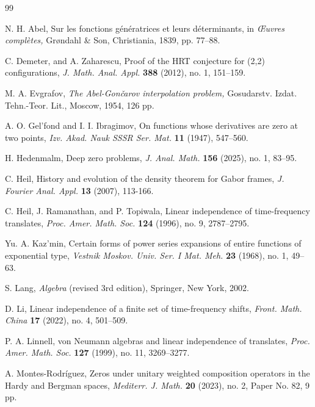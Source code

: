 \documentclass[reqno,11pt]{amsart}
\begin{document}
\begin{thebibliography}{99}

N. H. Abel, Sur les fonctions g\'{e}n\'{e}ratrices et leurs d\'{e}terminants, 
in {\sl{\OE}uvres compl\`{e}tes,}
Gr{\o}ndahl \& Son, Christiania, 1839, pp. 77--88.

C. Demeter, and A. Zaharescu,
Proof of the HRT conjecture for (2,2) configurations,
{\sl J. Math. Anal. Appl.} \textbf{388} (2012), no. 1, 151--159.

 M. A. Evgrafov, 
{\sl The Abel-Gon\v{c}arov interpolation problem,}
Gosudarstv. Izdat. Tehn.-Teor. Lit., Moscow, 1954, 126 pp.

A. O. Gel'fond and I. I. Ibragimov, 
On functions whose derivatives are zero at two points,
{\sl Izv. Akad. Nauk SSSR Ser. Mat.} \textbf{11} (1947), 547--560.


H. Hedenmalm, Deep zero problems,
{\sl J. Anal. Math.} \textbf{156} (2025), no. 1, 83--95.

C. Heil, History and evolution of the density theorem for Gabor frames,
{\sl J. Fourier Anal. Appl.} \textbf{13} (2007), 113-166.

C. Heil, J. Ramanathan, and P. Topiwala, 
Linear independence of time-frequency translates,
{\sl Proc. Amer. Math. Soc.} \textbf{124} (1996), no. 9, 2787--2795.

 Yu. A. Kaz'min,
Certain forms of power series expansions of entire functions of exponential type,
{\sl Vestnik Moskov. Univ. Ser. I Mat. Meh.} \textbf{23} (1968), no. 1, 49--63.


S. Lang, {\sl Algebra} (revised 3rd edition), Springer, New York, 2002. 

D. Li,  Linear independence of a finite set of time-frequency shifts,
{\sl Front. Math. China} \textbf{17} (2022), no. 4, 501--509.

P. A. Linnell, 
von Neumann algebras and linear independence of translates,
{\sl Proc. Amer. Math. Soc.} \textbf{127} (1999), no. 11, 3269--3277.

A. Montes-Rodr\'{i}guez,
Zeros under unitary weighted composition operators in the Hardy and 
Bergman spaces, {\sl Mediterr. J. Math.} \textbf{20} (2023), no. 2, 
Paper No. 82, 9 pp.


\end{thebibliography}
\end{document}
